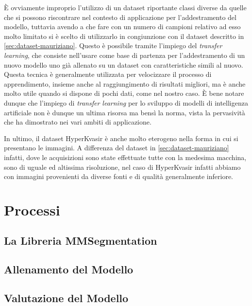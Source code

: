 È ovviamente improprio l'utilizzo di un dataset riportante
classi diverse da quelle che si possono riscontrare nel 
contesto di applicazione per l'addestramento del modello,
tuttavia avendo a che fare con un numero di campioni
relativo ad esso molto limitato si è scelto di utilizzarlo
in congiunzione con il dataset descritto in \ref{sec:dataset-mauriziano}.
Questo è possibile tramite l'impiego del {\it transfer learning},
che consiste nell'usare come base di partenza per l'addestramento
di un nuovo modello uno già allenato su un dataset con
caratteristiche simili al nuovo.
Questa tecnica è generalmente utilizzata per velocizzare
il processo di apprendimento, insieme anche al raggiungimento
di risultati migliori, ma è anche molto utile quando si 
dispone di pochi dati, come nel nostro caso.
È bene notare dunque che l'impiego di {\it transfer learning}
per lo sviluppo di modelli di intelligenza artificiale non è
dunque un ultima risorsa ma bensì la norma, vista la
pervasività che ha dimostrato nei vari ambiti di applicazione.

In ultimo, il dataset HyperKvasir è anche molto eterogeno
nella forma in cui si presentano le immagini.
A differenza del dataset in \ref{sec:dataset-mauriziano} infatti,
dove le acquisizioni sono state effettuate tutte con la medesima
macchina, sono di uguale ed altissima risoluzione, nel caso
di HyperKvasir infatti abbiamo con immagini provenienti da diverse
fonti e di qualità generalmente inferiore.


\section{Processi}
\subsection{La Libreria MMSegmentation}
\subsection{Allenamento del Modello}
\subsection{Valutazione del Modello}